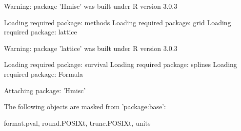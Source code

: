 %


 {\maketitle}
 {\frame{\titlepage}}
\tableofcontents
\begin{abstract}
 
\end{abstract}

\begin{Schunk}
\begin{Soutput}
Warning: package 'Hmisc' was built under R version 3.0.3
\end{Soutput}
\begin{Soutput}
Loading required package: methods
Loading required package: grid
Loading required package: lattice
\end{Soutput}
\begin{Soutput}
Warning: package 'lattice' was built under R version 3.0.3
\end{Soutput}
\begin{Soutput}
Loading required package: survival
Loading required package: splines
Loading required package: Formula

Attaching package: 'Hmisc'

The following objects are masked from 'package:base':

    format.pval, round.POSIXt, trunc.POSIXt, units
\end{Soutput}
\end{Schunk}











